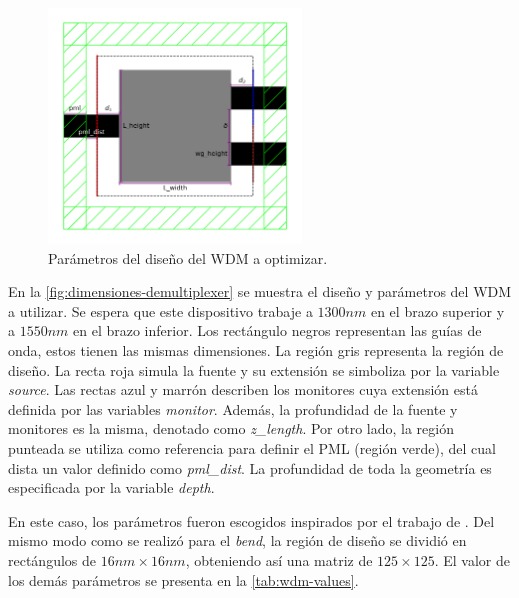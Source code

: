 \begin{figure}[ht]
  \centering
  \includegraphics[width=0.6\textwidth]{image/proposal/wdm.png}
  \caption{Parámetros del diseño del WDM a optimizar.}
  \label{fig:dimensiones-demultiplexer}
\end{figure}

En la \autoref{fig:dimensiones-demultiplexer} se muestra el diseño y parámetros del WDM a utilizar.
Se espera que este dispositivo trabaje a $1300 nm$ en el brazo superior y a $1550 nm$ en el brazo inferior.
Los rectángulo negros representan las guías de onda, estos tienen las mismas dimensiones.
La región gris representa la región de diseño.
La recta roja simula la fuente y su extensión se simboliza por la variable \emph{source}.
Las rectas azul y marrón describen los monitores cuya extensión está definida por las variables \emph{monitor}.
Además, la profundidad de la fuente y monitores es la misma, denotado como \emph{z\_length}.
Por otro lado, la región punteada se utiliza como referencia para definir el PML (región verde),
del cual dista un valor definido como \emph{pml\_dist}.
La profundidad de toda la geometría es especificada por la variable \emph{depth}.

En este caso, los parámetros fueron escogidos inspirados por el trabajo de \cite{Christiansen2021}.
Del mismo modo como se realizó para el \emph{bend}, 
la región de diseño se dividió en rectángulos de $16nm \times 16 nm$, obteniendo así una
matriz de $125 \times 125$.
El valor de los demás parámetros se presenta en la \autoref{tab:wdm-values}.

